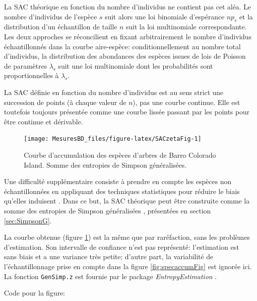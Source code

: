 \documentclass[
  11pt,
  french,
  a4paper,
  extrafontsizes,onecolumn,openright
  ]{memoir}
\begin{document}
La SAC théorique en fonction du nombre d'individus ne contient pas cet aléa.
Le nombre d'individus de l'espèce \(s\) suit alors une loi binomiale d'espérance \(np_s\) et la distribution d'un échantillon de taille \(n\) suit la loi multinomiale correspondante.
Les deux approches se réconcilient en fixant arbitrairement le nombre d'individus échantillonnés dans la courbe aire-espèce: conditionnellement au nombre total d'individus, la distribution des abondances des espèces issues de lois de Poisson de paramètres \(\lambda_s\) suit une loi multinomiale \autocite{Steel1953} dont les probabilités sont proportionnelles à \(\lambda_s\).

La SAC définie en fonction du nombre d'individus est au sens strict une succession de points (à chaque valeur de \(n\)), pas une courbe continue.
Elle est toutefois toujours présentée comme une courbe lissée passant par les points pour être continue et dérivable.



\scriptsize

\begin{figure}

{\centering \texttt{[image: MesuresBD\_files/figure-latex/SACzetaFig-1]} 

}

\caption{Courbe d'accumulation des espèces d'arbres de Barro Colorado Island. Somme des entropies de Simpson généralisées.}\label{fig:SACzetaFig}
\end{figure}

\normalsize

Une difficulté supplémentaire consiste à prendre en compte les espèces non échantillonnées en appliquant des techniques statistiques pour réduire le biais qu'elles induisent \autocite{Colwell2012}.
Dans ce but, la SAC théorique peut être construite \autocite{Chao2013} comme la somme des entropies de Simpson généralisées \autocite{Zhang2010}, présentées en section \ref{sec:SimpsonG}.

La courbe obtenue (figure \ref{fig:SACzetaFig}) est la même que par raréfaction, sans les problèmes d'estimation.
Son intervalle de confiance n'est pas représenté: l'estimation est sans biais et a une variance très petite; d'autre part, la variabilité de l'échantillonnage prise en compte dans la figure \ref{fig:specaccumFig} est ignorée ici. La fonction \texttt{GenSimp.z} est fournie par le package \emph{EntropyEstimation} \autocite{Cao2014}.

Code pour la figure:
\end{document}
